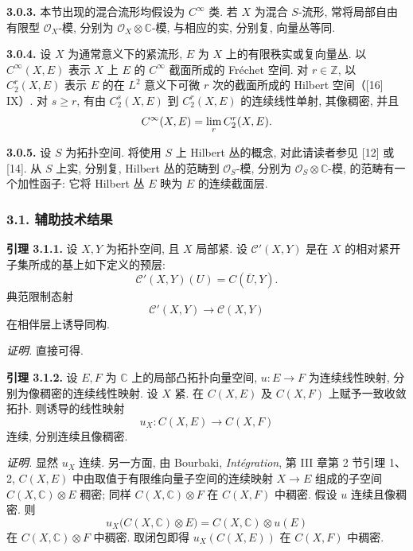 \textbf{3.0.3.} 本节出现的混合流形均假设为 $C^\infty$ 类. 若 $X$ 为混合 $S$-流形, 常将局部自由有限型 $\mathcal O_X$-模, 分别为 $\mathcal O_X\otimes\mathbb C$-模, 与相应的实, 分别复, 向量丛等同.

\textbf{3.0.4.} 设 $X$ 为通常意义下的紧流形, $E$ 为 $X$ 上的有限秩实或复向量丛. 以 $C^\infty(X,E)$ 表示 $X$ 上 $E$ 的 $C^\infty$ 截面所成的 Fréchet 空间. 对 $r\in\mathbb Z$, 以 $C_2^{r}(X,E)$ 表示 $E$ 的在 $L^2$ 意义下可微 $r$ 次的截面所成的 Hilbert 空间（[16] IX）. 对 $s\ge r$, 有由 $C_2^{s}(X,E)$ 到 $C_2^{r}(X,E)$ 的连续线性单射, 其像稠密, 并且
\[
 C^\infty(X,E)=\operatorname*{lim}_r C_2^{r}(X,E).
\]

\textbf{3.0.5.} 设 $S$ 为拓扑空间. 将使用 $S$ 上 Hilbert 丛的概念, 对此请读者参见 [12] 或 [14]. 从 $S$ 上实, 分别复, Hilbert 丛的范畴到 $\mathcal O_S$-模, 分别为 $\mathcal O_S\otimes\mathbb C$-模, 的范畴有一个加性函子: 它将 Hilbert 丛 $E$ 映为 $E$ 的连续截面层.

\subsubsection*{3.1. 辅助技术结果}

\textbf{引理 3.1.1.} 设 $X,Y$ 为拓扑空间, 且 $X$ 局部紧. 设 $\mathcal C'(X,Y)$ 是在 $X$ 的相对紧开子集所成的基上如下定义的预层:
\[
 \mathcal C'(X,Y)(U)=C(\overline U,Y).
\]
典范限制态射
\[
 \mathcal C'(X,Y)\longrightarrow \mathcal C(X,Y)
\]
在相伴层上诱导同构.

\emph{证明.} 直接可得.

\textbf{引理 3.1.2.} 设 $E,F$ 为 $\mathbb C$ 上的局部凸拓扑向量空间, $u:E\to F$ 为连续线性映射, 分别为像稠密的连续线性映射. 设 $X$ 紧. 在 $C(X,E)$ 及 $C(X,F)$ 上赋予一致收敛拓扑. 则诱导的线性映射
\[
 u_X:C(X,E)\longrightarrow C(X,F)
\]
连续, 分别连续且像稠密.

\emph{证明.} 显然 $u_X$ 连续. 另一方面, 由 Bourbaki, \emph{Intégration}, 第 III 章第 2 节引理 1、2, $C(X,E)$ 中由取值于有限维向量子空间的连续映射 $X\to E$ 组成的子空间 $C(X,\mathbb C)\otimes E$ 稠密; 同样 $C(X,\mathbb C)\otimes F$ 在 $C(X,F)$ 中稠密. 假设 $u$ 连续且像稠密. 则
\[
u_X\bigl(C(X,\mathbb C)\otimes E\bigr)=C(X,\mathbb C)\otimes u(E)
\]
在 $C(X,\mathbb C)\otimes F$ 中稠密. 取闭包即得 $u_X(C(X,E))$ 在 $C(X,F)$ 中稠密.

